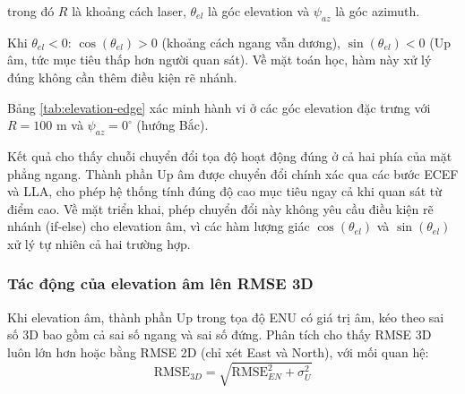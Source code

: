 trong đó $R$ là khoảng cách laser, $\theta_{el}$ là góc elevation và $\psi_{az}$ là góc azimuth.

Khi $\theta_{el} < 0$: $\cos(\theta_{el}) > 0$ (khoảng cách ngang vẫn dương), $\sin(\theta_{el}) < 0$ (Up âm, tức mục tiêu thấp hơn người quan sát). Về mặt toán học, hàm này xử lý đúng không cần thêm điều kiện rẽ nhánh.

Bảng \ref{tab:elevation-edge} xác minh hành vi ở các góc elevation đặc trưng với $R = 100$ m và $\psi_{az} = 0^{\circ}$ (hướng Bắc).

\begin{table}[H]
\centering
\caption{Kết quả chuyển đổi polar sang ENU với $R = 100$ m, $\psi_{az} = 0^{\circ}$, các góc elevation khác nhau}
\label{tab:elevation-edge}
\end{table}

Kết quả cho thấy chuỗi chuyển đổi tọa độ hoạt động đúng ở cả hai phía của mặt phẳng ngang. Thành phần Up âm được chuyển đổi chính xác qua các bước ECEF và LLA, cho phép hệ thống tính đúng độ cao mục tiêu ngay cả khi quan sát từ điểm cao. Về mặt triển khai, phép chuyển đổi này không yêu cầu điều kiện rẽ nhánh (if-else) cho elevation âm, vì các hàm lượng giác $\cos(\theta_{el})$ và $\sin(\theta_{el})$ xử lý tự nhiên cả hai trường hợp.

\subsubsection{Tác động của elevation âm lên RMSE 3D}

\hspace{0.5cm} Khi elevation âm, thành phần Up trong tọa độ ENU có giá trị âm, kéo theo sai số 3D bao gồm cả sai số ngang và sai số đứng. Phân tích cho thấy RMSE 3D luôn lớn hơn hoặc bằng RMSE 2D (chỉ xét East và North), với mối quan hệ:
\begin{equation}
\text{RMSE}_{3D} = \sqrt{\text{RMSE}_{EN}^2 + \sigma_U^2}
\label{eq:rmse-3d}
\end{equation}

